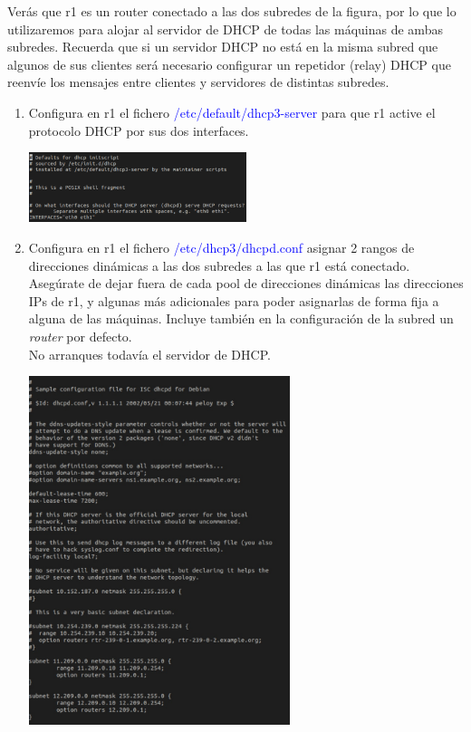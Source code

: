\documentclass[12pt, a4paper]{report}
\begin{document}
Verás que r1 es un router conectado a las dos subredes de la figura, por lo que lo utilizaremos para alojar
al servidor de DHCP de todas las máquinas de ambas subredes. Recuerda que si un servidor DHCP no está en
la misma subred que algunos de sus clientes será necesario configurar un repetidor (relay) DHCP que reenvíe
los mensajes entre clientes y servidores de distintas subredes.
\begin{enumerate}
	\item Configura en r1 el fichero \textcolor{blue}{/etc/default/dhcp3-server} para que r1 active el protocolo DHCP por sus
	dos interfaces.\\
	\begin{center}
		\includegraphics[width=0.5\textwidth]{ej1_1}
	\end{center}
	\item Configura en r1 el fichero \textcolor{blue}{/etc/dhcp3/dhcpd.conf} asignar 2 rangos de direcciones dinámicas a las dos
	subredes a las que r1 está conectado. Asegúrate de dejar fuera de cada pool de direcciones dinámicas
	las direcciones IPs de r1, y algunas más adicionales para poder asignarlas de forma fija a alguna de las
	máquinas. Incluye también en la configuración de la subred un \textit{router} por defecto.\\
	No arranques todavía el servidor de DHCP.\\
	\begin{center}
		\includegraphics[width=0.6\textwidth]{ej2_1}
	\end{center}
\end{enumerate}
\end{document}
